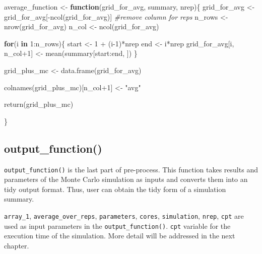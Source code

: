 \documentclass[11pt,a4paper]{article}
\newenvironment{Shaded}{\begin{snugshade}}{\end{snugshade}}
\newcommand{\CommentTok}[1]{\textcolor[rgb]{0.56,0.35,0.01}{\textit{#1}}}
\newcommand{\ControlFlowTok}[1]{\textcolor[rgb]{0.13,0.29,0.53}{\textbf{#1}}}
\newcommand{\DecValTok}[1]{\textcolor[rgb]{0.00,0.00,0.81}{#1}}
\newcommand{\FunctionTok}[1]{\textcolor[rgb]{0.00,0.00,0.00}{#1}}
\newcommand{\NormalTok}[1]{#1}
\newcommand{\OtherTok}[1]{\textcolor[rgb]{0.56,0.35,0.01}{#1}}
\newcommand{\SpecialCharTok}[1]{\textcolor[rgb]{0.00,0.00,0.00}{#1}}
\newcommand{\StringTok}[1]{\textcolor[rgb]{0.31,0.60,0.02}{#1}}
\begin{document}
\begin{Shaded}
\begin{Highlighting}[]
\NormalTok{average\_function }\OtherTok{\textless{}{-}} \ControlFlowTok{function}\NormalTok{(grid\_for\_avg, summary, nrep)\{}
\NormalTok{  grid\_for\_avg }\OtherTok{\textless{}{-}}\NormalTok{ grid\_for\_avg[}\SpecialCharTok{{-}}\FunctionTok{ncol}\NormalTok{(grid\_for\_avg)] }\CommentTok{\#remove column for reps}
\NormalTok{  n\_rows }\OtherTok{\textless{}{-}} \FunctionTok{nrow}\NormalTok{(grid\_for\_avg)}
\NormalTok{  n\_col }\OtherTok{\textless{}{-}} \FunctionTok{ncol}\NormalTok{(grid\_for\_avg)}
  
  \ControlFlowTok{for}\NormalTok{(i }\ControlFlowTok{in} \DecValTok{1}\SpecialCharTok{:}\NormalTok{n\_rows)\{}
\NormalTok{    start }\OtherTok{\textless{}{-}} \DecValTok{1} \SpecialCharTok{+}\NormalTok{ (i}\DecValTok{{-}1}\NormalTok{)}\SpecialCharTok{*}\NormalTok{nrep}
\NormalTok{    end }\OtherTok{\textless{}{-}}\NormalTok{ i}\SpecialCharTok{*}\NormalTok{nrep}
\NormalTok{    grid\_for\_avg[i, n\_col}\SpecialCharTok{+}\DecValTok{1}\NormalTok{] }\OtherTok{\textless{}{-}} \FunctionTok{mean}\NormalTok{(summary[start}\SpecialCharTok{:}\NormalTok{end, ])}
\NormalTok{  \}}
  
\NormalTok{  grid\_plus\_mc }\OtherTok{\textless{}{-}} \FunctionTok{data.frame}\NormalTok{(grid\_for\_avg)}
  
  \FunctionTok{colnames}\NormalTok{(grid\_plus\_mc)[n\_col}\SpecialCharTok{+}\DecValTok{1}\NormalTok{] }\OtherTok{\textless{}{-}} \StringTok{"avg"}
  
  \FunctionTok{return}\NormalTok{(grid\_plus\_mc)}
  
\NormalTok{\}}
\end{Highlighting}
\end{Shaded}

\hypertarget{output_function}{%
\subsection{output\_function()}\label{output_function}}

\texttt{output\_function()} is the last part of pre-process. This
function takes results and parameters of the Monte Carlo simulation as
inputs and converts them into an tidy output format. Thus, user can
obtain the tidy form of a simulation summary.

\texttt{array\_1}, \texttt{average\_over\_reps}, \texttt{parameters},
\texttt{cores}, \texttt{simulation}, \texttt{nrep}, \texttt{cpt} are
used as input parameters in the \texttt{output\_function()}.
\texttt{cpt} variable for the execution time of the simulation. More
detail will be addressed in the next chapter.
\end{document}
